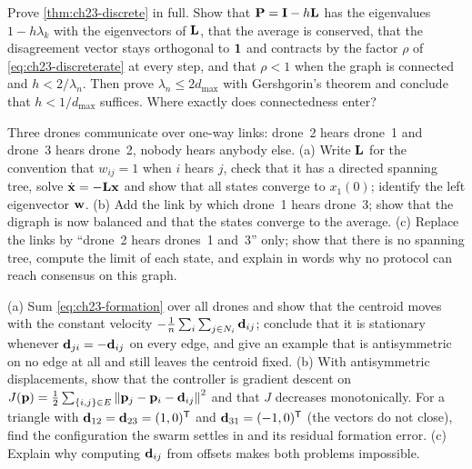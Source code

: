\begin{exercise}[\difficulty{2}]
\label{exr:ch23-proof}
Prove \cref{thm:ch23-discrete} in full. Show that $\mathbf{P} = \mathbf{I} -
h\mathbf{L}$ has the eigenvalues $1 - h\lambda_k$ with the eigenvectors of
$\mathbf{L}$, that the average is conserved, that the disagreement vector stays
orthogonal to $\mathbf{1}$ and contracts by the factor $\rho$ of
\cref{eq:ch23-discreterate} at every step, and that $\rho < 1$ when the graph
is connected and $h < 2/\lambda_n$. Then prove $\lambda_n \le 2d_{\max}$
with Gershgorin's theorem and conclude that $h < 1/d_{\max}$ suffices.
Where exactly does connectedness enter?
\end{exercise}

\begin{exercise}[\difficulty{2}]
\label{exr:ch23-directed}
Three drones communicate over one-way links: drone~2 hears drone~1 and
drone~3 hears drone~2, nobody hears anybody else. (a) Write $\mathbf{L}$ for the
convention that $w_{ij} = 1$ when $i$ hears $j$, check that it has a directed
spanning tree, solve $\dot{\mathbf{x}} = -\mathbf{L}\mathbf{x}$ and show that all
states converge to $x_1(0)$; identify the left eigenvector $\mathbf{w}$. (b) Add
the link by which drone~1 hears drone~3; show that the digraph is now balanced
and that the states converge to the average. (c) Replace the links by ``drone~2
hears drones~1 and~3'' only; show that there is no spanning tree, compute the
limit of each state, and explain in words why no protocol can reach consensus
on this graph.
\end{exercise}

\begin{exercise}[\difficulty{2}]
\label{exr:ch23-inconsistent}
(a) Sum \cref{eq:ch23-formation} over all drones and show that the centroid
moves with the constant velocity $-\frac{1}{n}\sum_i\sum_{j \in N_i}
\mathbf{d}_{ij}$; conclude that it is stationary whenever $\mathbf{d}_{ji} =
-\mathbf{d}_{ij}$ on every edge, and give an example that is antisymmetric on no
edge at all and still leaves the centroid fixed. (b) With antisymmetric displacements, show that the
controller is gradient descent on $J(\mathbf{p}) = \frac12\sum_{\left\{ i,j \right\}\in E}
\left\lVert \mathbf{p}_j - \mathbf{p}_i - \mathbf{d}_{ij} \right\rVert^2$ and that $J$ decreases monotonically.
For a triangle with $\mathbf{d}_{12} = \mathbf{d}_{23} = (1, 0)^{\mathsf{T}}$ and
$\mathbf{d}_{31} = (-1, 0)^{\mathsf{T}}$ (the vectors do not close), find the configuration
the swarm settles in and its residual formation error. (c) Explain why
computing $\mathbf{d}_{ij}$ from offsets makes both problems impossible.
\end{exercise}


